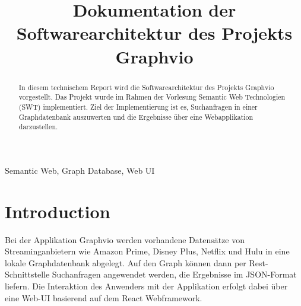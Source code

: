 \documentclass[conference]{IEEEtran}
\begin{document}
\title{Dokumentation der Softwarearchitektur des Projekts Graphvio}


\author{
	\and

	\and

	\and

	\and

}

\maketitle

\begin{abstract}
In diesem technischem Report wird die Softwarearchitektur des Projekts 
Graphvio vorgestellt. Das Projekt wurde im Rahmen der Vorlesung Semantic 
Web Technologien (SWT) implementiert. Ziel der Implementierung ist es, 
Suchanfragen in einer Graphdatenbank auszuwerten und die Ergebnisse 
über eine Webapplikation darzustellen.
\end{abstract}

\begin{IEEEkeywords}
 Semantic Web, Graph Database, Web UI
\end{IEEEkeywords}

\section{Introduction}
Bei der Applikation Graphvio werden vorhandene Datensätze von Streaminganbietern wie 
Amazon Prime, Disney Plus, Netflix und Hulu in eine lokale Graphdatenbank abgelegt.
Auf den Graph können dann per Rest-Schnittstelle Suchanfragen angewendet werden, die Ergebnisse
im JSON-Format liefern. Die Interaktion des Anwenders mit der Applikation erfolgt dabei über eine Web-UI basierend auf dem 
React Webframework.
\end{document}
